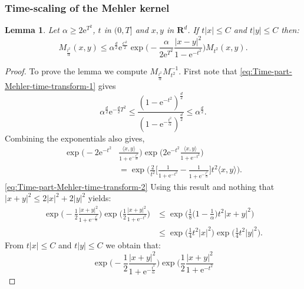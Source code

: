 \documentclass[a4paper,oneside,10pt]{amsproc}
\theoremstyle{plain}
\newtheorem{lemma}{Lemma}
\theoremstyle{remark}
\theoremstyle{definition}
\newcommand{\la}{\langle}
\newcommand{\ra}{\rangle}
\renewcommand{\leq}{\leqslant}
\renewcommand{\leq}{\leqslant}
\renewcommand{\geq}{\geqslant}
\newcommand{\R}{\mathbf R}
\newcommand{\e}{\mathrm{e}} %
\renewcommand{\leq}{\leqslant}%
\renewcommand{\geq}{\geqslant}%
\begin{document}
\subsubsection{Time-scaling of the Mehler kernel}
\begin{lemma}\label{lem:Kernel-estimates-1}
 Let $\alpha \geq 2 \e^{T^2}$, $t$ in $(0, T]$ and $x, y$ in $\R^d$.
 If $t |x| \leq C$ and $t |y| \leq C$ then:
  \begin{equation}
    \label{eq:Kernel-lemma-1-estimate} 
    M_{\frac{t^2}{\alpha}}(x, y) \leq \alpha^{\frac{d}2}
    \e^{\frac{C^2}2} \exp\biggl (-\frac{\alpha}{2
      \e^{T^2}} \frac{|x - y|^2}{1 - \e^{-t^2}} \biggr ) M_{t^2}(x,
    y).
  \end{equation}
\end{lemma}
\begin{proof}
  To prove the lemma we compute $M_{\frac{t^2}{\alpha}} M_{t^2}^{-1}$.
  First note that \eqref{eq:Time-part-Mehler-time-transform-1} gives
  \begin{equation*}
        \alpha^{\frac{d}2} \e^{-\frac{d}2 T^2} \leq \frac{(1 - \e^{-t^2})^{\frac{d}2}}{(1 -
          \e^{-\frac{t^2}{\alpha}})^{\frac{d}2}} \leq \alpha^{\frac{d}2}.
  \end{equation*}
  Combining the exponentials also gives,
  \begin{align*}
    \exp \biggl (-2\e^{-t^2} &\frac{\la x, y \ra}{1 + \e^{-\frac{t^2}{\alpha}}}
    \biggr ) \exp \biggl (2 \e^{-t^2} \frac{\la x, y \ra}{1 + \e^{-t^2}}
    \biggr )\\
    &= \exp \biggl (\frac2{t^2}\biggl[\frac{1}{1 +
      \e^{-t^2}} - \frac{1}{1 + \e^{-\frac{t^2}{\alpha}}}
    \biggr] t^2 \la x, y \ra \biggr).
  \end{align*}
\eqref{eq:Time-part-Mehler-time-transform-2}
  Using this result and nothing that $|x + y|^2 \leq 2|x|^2 + 2|y|^2$
  yields:
  \begin{align*}
    \exp \biggl (-\frac12 \frac{|x + y|^2}{1 + \e^{-\frac{t^2}{\alpha}}}
    \biggr ) \exp \biggl (\frac12 \frac{|x + y|^2}{1 + \e^{-t^2}}
    \biggr ) &\leq \exp \biggl (\frac18 \biggl(1 - \frac1\alpha \biggr) t^2 |x +
    y|^2 \biggr)\\
    &\leq \exp \biggl (\frac14 t^2 |x|^2 \biggr) \exp \biggl (\frac14
    t^2 |y|^2 \biggr).
  \end{align*}
  From $t |x| \leq C$ and $t |y| \leq C$ we obtain that:
  \begin{equation*}
    \exp \biggl (-\frac12 \frac{|x + y|^2}{1 + \e^{-\frac{t^2}{\alpha}}}
    \biggr ) \exp \biggl (\frac12 \frac{|x + y|^2}{1 + \e^{-t^2}}

\end{equation*}
\end{proof}
\end{document}

